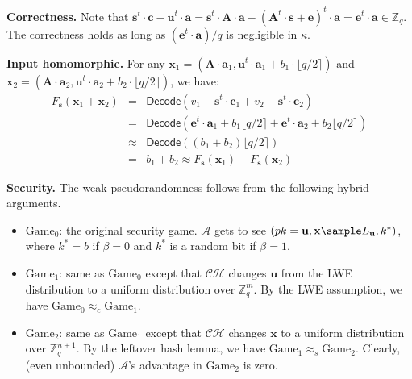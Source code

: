 \documentclass[a4paper,10pt]{article}
\begin{document}
\begin{trivlist}
\item \textbf{Correctness.} Note that $\mathbf{s}^t \cdot \mathbf{c} - \mathbf{u}^t \cdot \mathbf{a} = 
    \mathbf{s}^t \cdot \mathbf{A} \cdot \mathbf{a} - (\mathbf{A}^t \cdot \mathbf{s}  + \mathbf{e})^t \cdot \mathbf{a} 
    = \mathbf{e}^t \cdot \mathbf{a} \in \mathbb{Z}_q$. 
    The correctness holds as long as $(\mathbf{e}^t \cdot \mathbf{a})/q$ is negligible in $\kappa$.

\item \textbf{Input homomorphic.} For any $\mathbf{x}_1 = (\mathbf{A} \cdot \mathbf{a}_1, 
    \mathbf{u}^t \cdot \mathbf{a}_1 + b_1 \cdot \lfloor q/2\rceil)$ 
    and $\mathbf{x}_2 = (\mathbf{A} \cdot \mathbf{a}_2, 
    \mathbf{u}^t \cdot \mathbf{a}_2 + b_2 \cdot \lfloor q/2\rceil)$, we have: 
\begin{eqnarray*}
    F_\mathbf{s}(\mathbf{x}_1+\mathbf{x}_2) &=& \mathsf{Decode}(v_1 - \mathbf{s}^t \cdot \mathbf{c}_1 + 
        v_2 - \mathbf{s}^t \cdot \mathbf{c}_2)\\ 
        &=& \mathsf{Decode}(\mathbf{e}^t \cdot \mathbf{a}_1 + b_1\lfloor q/2\rceil + 
        \mathbf{e}^t \cdot \mathbf{a}_2 + b_2\lfloor q/2\rceil)\\ 
        &\approx& \mathsf{Decode}((b_1+b_2)\lfloor q/2\rceil) \\
        & = & b_1+b_2 \approx F_\mathbf{s}(\mathbf{x}_1) + F_\mathbf{s}(\mathbf{x}_2)
\end{eqnarray*} 

\item \textbf{Security.} The weak pseudorandomness follows from the following hybrid arguments. 

\begin{itemize}
    \item $\text{Game}_0$: the original security game. 
        $\mathcal{A}$ gets to see $(pk = \mathbf{u}, \mathbf{x} \sample L_\mathbf{u}, k^*)$, 
        where $k^* = b$ if $\beta = 0$ and $k^*$ is a random bit if $\beta=1$.  

    \item $\text{Game}_1$: same as $\text{Game}_0$ except that $\mathcal{CH}$ changes $\mathbf{u}$ 
        from the LWE distribution to a uniform distribution over $\mathbb{Z}_q^m$.  
        By the LWE assumption, we have $\text{Game}_0 \approx_c \text{Game}_1$. 

    \item $\text{Game}_2$: same as $\text{Game}_1$ except that $\mathcal{CH}$ changes $\mathbf{x}$ 
        to a uniform distribution over $\mathbb{Z}_q^{n+1}$. 
        By the leftover hash lemma, we have $\text{Game}_1 \approx_s \text{Game}_2$. 
        Clearly, (even unbounded) $\mathcal{A}$'s advantage in $\text{Game}_2$ is zero.  
\end{itemize}

\end{trivlist}
\end{document}
